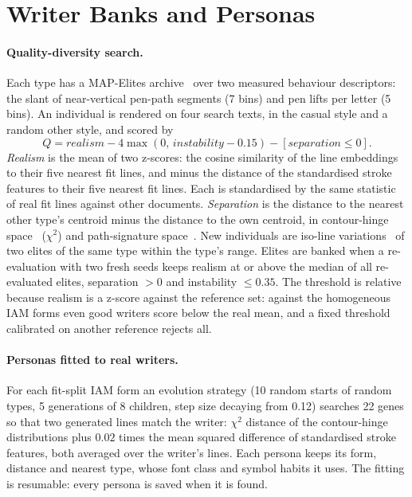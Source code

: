 \documentclass[10pt,twocolumn]{article}
\begin{document}
\section{Writer Banks and Personas}
\label{sec:banks}

\paragraph{Quality-diversity search.} Each type has a MAP-Elites archive~\cite{mouret2015} over two measured
behaviour descriptors: the slant of near-vertical pen-path segments (7 bins) and pen lifts per letter (5 bins).
An individual is rendered on four search texts, in the casual style and a random other style, and scored by
\begin{equation}
  Q=\textit{realism}-4\max(0,\,\textit{instability}-0.15)-[\textit{separation}\le 0].
\end{equation}
\emph{Realism} is the mean of two z-scores: the cosine similarity of the line embeddings to their five nearest fit
lines, and minus the distance of the standardised stroke features to their five nearest fit lines. Each is
standardised by the same statistic of real fit lines against other documents. \emph{Separation} is the distance
to the nearest other type's centroid minus the distance to the own centroid, in contour-hinge space~\cite{bulacu2007}
($\chi^2$) and path-signature space~\cite{lai2019}. New individuals are iso-line variations~\cite{vassiliades2018}
of two elites of the same type within the type's range. Elites are banked when a re-evaluation with two fresh
seeds keeps realism at or above the median of all re-evaluated elites, separation $>0$ and instability $\le 0.35$.
The threshold is relative because realism is a z-score against the reference set: against the homogeneous IAM forms
even good writers score below the real mean, and a fixed threshold calibrated on another reference rejects all.

\paragraph{Personas fitted to real writers.} For each fit-split IAM form an evolution strategy (10 random starts of
random types, 5 generations of 8 children, step size decaying from 0.12) searches 22 genes so that two generated
lines match the writer: $\chi^2$ distance of the contour-hinge distributions plus $0.02$ times the mean squared
difference of standardised stroke features, both averaged over the writer's lines. Each persona keeps its form,
distance and nearest type, whose font class and symbol habits it uses. The fitting is resumable: every persona is
saved when it is found. 
\end{document}
